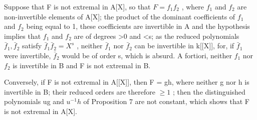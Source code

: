 Suppose that F is not extremal in A{[}X{]}, so that \(F = f_{1}f_{2}\) , where \(f_{1}\) and \(f_{2}\) are non-invertible elements of A{[}X{]}; the product of the dominant coefficients of \(f_{1}\) and \(f_{2}\) being equal to 1, these coefficients are invertible in A and the hypothesis implies that \(f_{1}\) and \(f_{2}\) are of degrees \textgreater0 and \textless s; as the reduced polynomials \(\bar{f}_{1}, \bar{f}_{2}\) satisfy \(\bar{f}_{1}\bar{f}_{2} = X^{s}\) , neither \(\bar{f}_{1}\) nor \(\bar{f}_{2}\) can be invertible in k{[}{[}X{]}{]}, for, if \(\bar{f}_{1}\) were invertible, \(\bar{f}_{2}\) would be of order s, which is absurd. A fortiori, neither \(f_{1}\) nor \(f_{2}\) is invertible in B and F is not extremal in B.

Conversely, if F is not extremal in A{[}{[}X{]}{]}, then F = gh, where neither g nor h is invertible in B; their reduced orders are therefore \(\geqslant 1\) ; then the distinguished polynomials ug and \(u^{-1}h\) of Proposition 7 are not constant, which shows that F is not extremal in A{[}X{]}.

